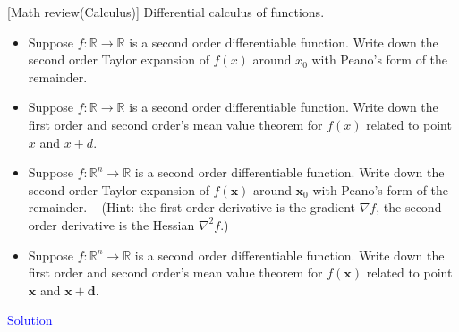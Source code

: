 \item {} [Math review(Calculus)] Differential calculus of functions.

\begin{itemize}
    \item[(a)] Suppose $f: \mathbb{R} \rightarrow \mathbb{R}$ is a second order differentiable function. Write down the second order Taylor expansion of $f(x)$ around $x_0$ with Peano's form of the remainder. ~
    \item[(b)] Suppose $f: \mathbb{R} \rightarrow \mathbb{R}$ is a second order differentiable function. Write down the first order and second order's mean value theorem for $f(x)$ related to point $x$ and $x+d$. ~
    \item[(c)] Suppose $f: \mathbb{R}^n\rightarrow \mathbb{R}$ is a second order differentiable function. Write down the second order Taylor expansion of $f(\mathbf{x})$ around $\mathbf{x}_0$ with Peano's form of the remainder. ~ (Hint: the first order derivative is the gradient $\nabla f$, the second order derivative is the Hessian $\nabla^2 f$.)
    \item[(d)] Suppose $f: \mathbb{R}^n\rightarrow \mathbb{R}$ is a second order differentiable function. Write down the first order and second order's mean value theorem for $f(\mathbf{x})$ related to point $\mathbf{x}$ and $\mathbf{x}+\mathbf{d}$. ~
\end{itemize}

\textcolor{blue}{Solution} \\

